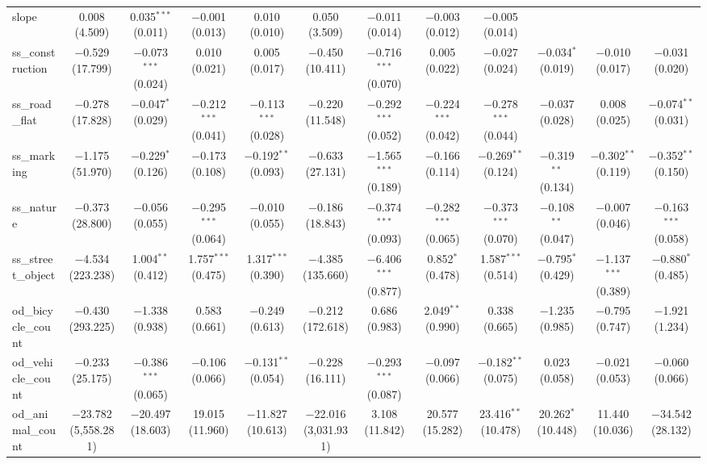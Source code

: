 \begin{table}[!htbp]
\begin{tabular}{@{\extracolsep{1pt}}lccccccccccc}
  slope & 0.008 (4.509) & 0.035$^{***}$ (0.011) & $-$0.001 (0.013) & 0.010 (0.010) & 0.050 (3.509) & $-$0.011 (0.014) & $-$0.003 (0.012) & $-$0.005 (0.014) &  &  &  \\ 
  ss\_construction & $-$0.529 (17.799) & $-$0.073$^{***}$ (0.024) & 0.010 (0.021) & 0.005 (0.017) & $-$0.450 (10.411) & $-$0.716$^{***}$ (0.070) & 0.005 (0.022) & $-$0.027 (0.024) & $-$0.034$^{*}$ (0.019) & $-$0.010 (0.017) & $-$0.031 (0.020) \\ 
  ss\_road\_flat & $-$0.278 (17.828) & $-$0.047$^{*}$ (0.029) & $-$0.212$^{***}$ (0.041) & $-$0.113$^{***}$ (0.028) & $-$0.220 (11.548) & $-$0.292$^{***}$ (0.052) & $-$0.224$^{***}$ (0.042) & $-$0.278$^{***}$ (0.044) & $-$0.037 (0.028) & 0.008 (0.025) & $-$0.074$^{**}$ (0.031) \\ 
  ss\_marking & $-$1.175 (51.970) & $-$0.229$^{*}$ (0.126) & $-$0.173 (0.108) & $-$0.192$^{**}$ (0.093) & $-$0.633 (27.131) & $-$1.565$^{***}$ (0.189) & $-$0.166 (0.114) & $-$0.269$^{**}$ (0.124) & $-$0.319$^{**}$ (0.134) & $-$0.302$^{**}$ (0.119) & $-$0.352$^{**}$ (0.150) \\ 
  ss\_nature & $-$0.373 (28.800) & $-$0.056 (0.055) & $-$0.295$^{***}$ (0.064) & $-$0.010 (0.055) & $-$0.186 (18.843) & $-$0.374$^{***}$ (0.093) & $-$0.282$^{***}$ (0.065) & $-$0.373$^{***}$ (0.070) & $-$0.108$^{**}$ (0.047) & $-$0.007 (0.046) & $-$0.163$^{***}$ (0.058) \\ 
  ss\_street\_object & $-$4.534 (223.238) & 1.004$^{**}$ (0.412) & 1.757$^{***}$ (0.475) & 1.317$^{***}$ (0.390) & $-$4.385 (135.660) & $-$6.406$^{***}$ (0.877) & 0.852$^{*}$ (0.478) & 1.587$^{***}$ (0.514) & $-$0.795$^{*}$ (0.429) & $-$1.137$^{***}$ (0.389) & $-$0.880$^{*}$ (0.485) \\ 
  od\_bicycle\_count & $-$0.430 (293.225) & $-$1.338 (0.938) & 0.583 (0.661) & $-$0.249 (0.613) & $-$0.212 (172.618) & 0.686 (0.983) & 2.049$^{**}$ (0.990) & 0.338 (0.665) & $-$1.235 (0.985) & $-$0.795 (0.747) & $-$1.921 (1.234) \\ 
  od\_vehicle\_count & $-$0.233 (25.175) & $-$0.386$^{***}$ (0.065) & $-$0.106 (0.066) & $-$0.131$^{**}$ (0.054) & $-$0.228 (16.111) & $-$0.293$^{***}$ (0.087) & $-$0.097 (0.066) & $-$0.182$^{**}$ (0.075) & 0.023 (0.058) & $-$0.021 (0.053) & $-$0.060 (0.066) \\ 
  od\_animal\_count & $-$23.782 (5,558.281) & $-$20.497 (18.603) & 19.015 (11.960) & $-$11.827 (10.613) & $-$22.016 (3,031.931) & 3.108 (11.842) & 20.577 (15.282) & 23.416$^{**}$ (10.478) & 20.262$^{*}$ (10.448) & 11.440 (10.036) & $-$34.542 (28.132) \\ 

\end{tabular}
\end{table}
